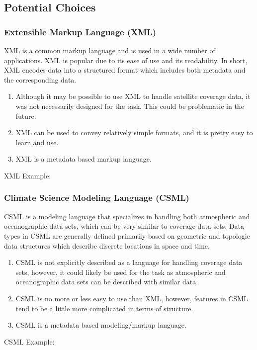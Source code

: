 \documentclass[onecolumn, draftclsnofoot,10pt, compsoc]{IEEEtran}
\begin{document}
\subsection{Potential Choices}

\subsubsection{Extensible Markup Language (XML)}
XML is a common markup language and is used in a wide number of applications. XML is popular due to its ease of use and its readability. In short, XML encodes data into a structured format which includes both metadata and the corresponding data.
\begin{enumerate}
\item Although it may be possible to use XML to handle satellite coverage data, it was not necessarily designed for the task. This could be problematic in the future.
\item XML can be used to convey relatively simple formats, and it is pretty easy to learn and use.
\item XML is a metadata based markup language.
\end{enumerate}

XML Example:


\subsubsection{Climate Science Modeling Language (CSML)}
CSML is a modeling language that specializes in handling both atmospheric and oceanographic data sets, which can be very similar to coverage data sets. Data types in CSML are generally defined primarily based on geometric and topologic data structures which describe discrete locations in space and time.
\begin{enumerate}
\item CSML is not explicitly described as a language for handling coverage data sets, however, it could likely be used for the task as atmospheric and oceanographic data sets can be described with similar data.
\item CSML is no more or less easy to use than XML, however, features in CSML tend to be a little more complicated in terms of structure.
\item CSML is a metadata based modeling/markup language.
\end{enumerate}

CSML Example:

\end{document}
